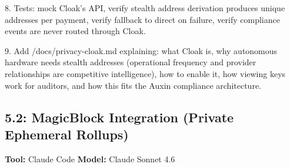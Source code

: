 \documentclass[11pt, a4paper]{article}
\begin{document}
\begin{promptbox}
8. Tests: mock Cloak's API, verify stealth address derivation produces unique addresses per payment, verify fallback to direct on failure, verify compliance events are never routed through Cloak.

9. Add /docs/privacy-cloak.md explaining: what Cloak is, why autonomous hardware needs stealth addresses (operational frequency and provider relationships are competitive intelligence), how to enable it, how viewing keys work for auditors, and how this fits the Auxin compliance architecture.
\end{promptbox}

\subsection*{5.2: MagicBlock Integration (Private Ephemeral Rollups)}
\textbf{Tool:} Claude Code \quad \textbf{Model:} Claude Sonnet 4.6
\end{document}
